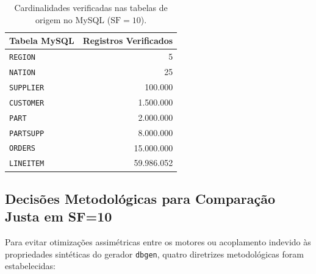 \documentclass[12pt,a4paper]{article}
\begin{document}
\begin{table}[H]
\centering
\caption{Cardinalidades verificadas nas tabelas de origem no MySQL ($\text{SF}=10$).}
\label{tab:cardinalidades}
\begin{tabular}{lr}
\toprule
\textbf{Tabela MySQL} & \textbf{Registros Verificados} \\
\midrule
\texttt{REGION}   & 5 \\
\texttt{NATION}   & 25 \\
\texttt{SUPPLIER} & 100.000 \\
\texttt{CUSTOMER} & 1.500.000 \\
\texttt{PART}     & 2.000.000 \\
\texttt{PARTSUPP} & 8.000.000 \\
\texttt{ORDERS}   & 15.000.000 \\
\texttt{LINEITEM} & 59.986.052 \\
\bottomrule
\end{tabular}
\end{table}

\subsection{Decisões Metodológicas para Comparação Justa em SF=10}
Para evitar otimizações assimétricas entre os motores ou acoplamento indevido às propriedades sintéticas do gerador \texttt{dbgen}, quatro diretrizes metodológicas foram estabelecidas:
\end{document}
